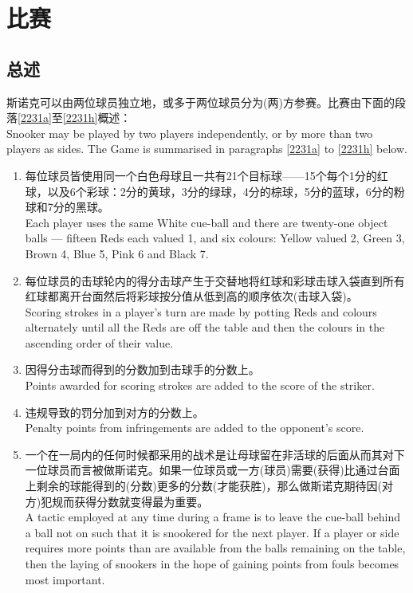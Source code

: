 \section{比赛}\label{223}

\subsection{总述}

\noindent 斯诺克可以由两位球员独立地，或多于两位球员分为(两)方参赛。比赛由下面的段落\ref{2231a}至\ref{2231h}概述：\\
Snooker may be played by two players independently, or by more than two players as sides. The Game is summarised in paragraphs \ref{2231a} to \ref{2231h} below.
\begin{enumerate}[label=(\alph*)]
    \item \label{2231a}每位球员皆使用同一个白色母球且一共有21个目标球——15个每个1分的红球，以及6个彩球：2分的黄球，3分的绿球，4分的棕球，5分的蓝球，6分的粉球和7分的黑球。\\
    Each player uses the same White cue-ball and there are twenty-one object balls --- fifteen Reds each valued 1, and six colours: Yellow valued 2, Green 3, Brown 4, Blue 5, Pink 6 and Black 7.
    \item 每位球员的击球轮内的得分击球产生于交替地将红球和彩球击球入袋直到所有红球都离开台面然后将彩球按分值从低到高的顺序依次(击球入袋)。\\
    Scoring strokes in a player's turn are made by potting Reds and colours alternately until all the Reds are off the table and then the colours in the ascending order of their value.
    \item 因得分击球而得到的分数加到击球手的分数上。\\
    Points awarded for scoring strokes are added to the score of the striker.
    \item 违规导致的罚分加到对方的分数上。\\
    Penalty points from infringements are added to the opponent's score.
    \item 一个在一局内的任何时候都采用的战术是让母球留在非活球的后面从而其对下一位球员而言被做斯诺克。如果一位球员或一方(球员)需要(获得)比通过台面上剩余的球能得到的(分数)更多的分数(才能获胜)，那么做斯诺克期待因(对方)犯规而获得分数就变得最为重要。\\
    A tactic employed at any time during a frame is to leave the cue-ball behind a ball not on such that it is snookered for the next player. If a player or side requires more points than are available from the balls remaining on the table, then the laying of snookers in the hope of gaining points from fouls becomes most important.

\end{enumerate}

